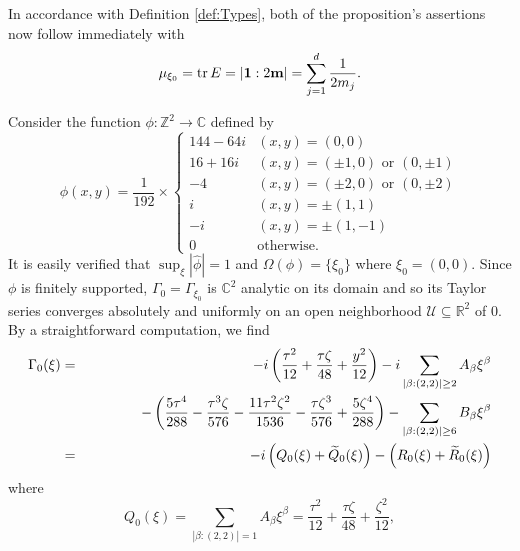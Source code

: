 \documentclass[smallextended]{svjour3}
\theoremstyle{remark}
\renewenvironment{proof}[1][\proofname]{\renewcommand\xproofname{#1}\xproof}{\endxproof}
\newcommand{\lp}{\left(}
\newcommand{\rp}{\right)}
\newcommand{\f}[2]{\frac{#1}{#2}}
\begin{document}
\begin{proof}
\noindent In accordance with Definition \ref{def:Types}, both of the proposition's assertions now follow immediately with
\begin{equation*}
    \mu_{\xi_0}=\tr E=|\mathbf{1}:2\mathbf{m}|=\sum_{j=1}^d\frac{1}{2m_j}.
\end{equation*}




\end{proof}

\begin{example}\normalfont
Consider the function $\phi : \mathbb{Z}^2 \to \mathbb{C}$ defined by 
\begin{equation*}
    \phi(x,y) =
    \frac{1}{192}\times
    \begin{cases}
    144 - 64i &(x,y) = (0,0)\\
    16 + 16i &(x,y) = (\pm 1, 0)\mbox{ or }(0,\pm 1)\\
    -4        &(x,y) = (\pm 2,0)\mbox{ or }(0,\pm 2)\\
    i   &(x,y) = \pm(1,1)\\
    -i   &(x,y) = \pm(1,-1)\\
    0& \text{otherwise}.
    \end{cases}
\end{equation*}
It is easily verified that $\sup_{\xi}|\widehat{\phi}|=1$ and $\Omega(\phi) = \{\xi_0 \}$ where $\xi_0=(0,0)$. Since $\phi$ is finitely supported, $\Gamma_{0}=\Gamma_{\xi_0}$ is $\mathbb{C}^2$ analytic on its domain and so its Taylor series converges absolutely and uniformly on an open neighborhood $\mathcal{U}\subseteq \mathbb{R}^2$ of $0$. By a straightforward computation, we find
\begin{eqnarray*}
\Gamma_{0}(\xi)
&=& 
-i\lp \frac{\tau^2}{12} +\frac{\tau\zeta}{48} + \frac{y^2}{12}   \rp
-i \sum_{|\beta:(2,2)|\geq 2}A_\beta \xi^\beta\\
&& 
\hspace{1.3cm}-\lp \frac{5\tau^4}{288} -\f{\tau^3\zeta}{576} -\frac{11\tau^2\zeta^2}{1536}-\frac{\tau\zeta^3}{576} + \frac{5\zeta^4}{288}  \rp 
- \sum_{|\beta:(2,2)|\geq 6}B_\beta \xi^\beta\\
&=&-i\lp Q_{0}(\xi)+\widetilde{Q}_{0}(\xi)\rp-\lp R_0(\xi)+\widetilde{R}_0(\xi)\rp
\end{eqnarray*}
where
\begin{equation*}
Q_{0}(\xi)=\sum_{|\beta:(2,2)|=1}A_\beta \xi^\beta=\frac{\tau^2}{12} +\frac{\tau\zeta}{48} + \frac{\zeta^2}{12},
\end{equation*}

\end{example}
\end{document}
